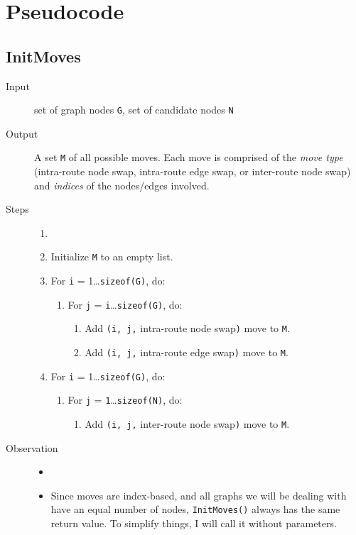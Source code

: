 \documentclass[14pt]{article}
\begin{document}
\newpage
\section{Pseudocode}

\subsection{InitMoves}
\begin{description}
	\item [Input] set of graph nodes \verb`G`, set of candidate nodes \verb`N`
	\item [Output] A set \verb`M` of all possible moves. Each move is comprised
		of the \emph{move type} (intra-route node swap, intra-route edge swap,
		or inter-route node swap) and \emph{indices} of the nodes/edges
		involved.
	\item [Steps]
		\begin{enumerate}\item []
			\item Initialize \verb`M` to an empty list.
			\item For \verb`i` = 1{\ldots}\verb`sizeof(G)`, do:
				\begin{enumerate}
					\item For \verb`j` = \verb`i`{\ldots}\verb`sizeof(G)`, do:
						\begin{enumerate}
							\item Add \verb`(i, j,` intra-route node swap\verb`)` move to \verb`M`.
							\item Add \verb`(i, j,` intra-route edge swap\verb`)` move to \verb`M`.
						\end{enumerate}
				\end{enumerate}
			\item For \verb`i` = 1{\ldots}\verb`sizeof(G)`, do:
				\begin{enumerate}
					\item For \verb`j` = \verb`1`{\ldots}\verb`sizeof(N)`, do:
						\begin{enumerate}
							\item Add \verb`(i, j,` inter-route node swap\verb`)` move to \verb`M`.
						\end{enumerate}
				\end{enumerate}
		\end{enumerate}
	\item [Observation]
		\begin{itemize}\item []
			\item Since moves are index-based, and all graphs we will be
				dealing with have an equal number of nodes, \verb`InitMoves()`
				always has the same return value. To simplify things, I will
				call it without parameters.
		\end{itemize}
\end{description}
\end{document}
